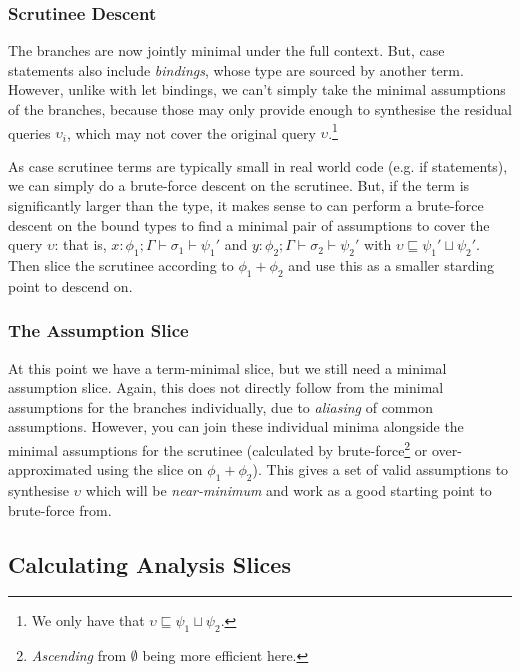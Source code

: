 \subsubsection{Scrutinee Descent}
\label{sec:case-phase2}

The branches are now jointly minimal under the full context. But, case statements also include \textit{bindings}, whose type are sourced by another term. However, unlike with let bindings, we can't simply take the minimal assumptions of the branches, because those may only provide enough to synthesise the residual queries $\upsilon_i$, which may not cover the original query $\upsilon$.\footnote{We only have that $\upsilon \sqsubseteq \psi_1 \sqcup \psi_2$.}

As case scrutinee terms are typically small in real world code (e.g. if statements), we can simply do a brute-force descent on the scrutinee. But, if the term is significantly larger than the type, it makes sense to can perform a brute-force descent on the bound types to find a minimal pair of assumptions to cover the query $\upsilon$: that is, $x : \phi_1; \Gamma \vdash \sigma_1 \vdash \psi_1'$ and $y : \phi_2; \Gamma \vdash \sigma_2 \vdash \psi_2'$ with $\upsilon \sqsubseteq \psi_1' \sqcup \psi_2'$. Then slice the scrutinee according to $\phi_1 + \phi_2$ and use this as a smaller starding point to descend on. 

\subsubsection{The Assumption Slice}
\label{sec:case-phase3}

At this point we have a term-minimal slice, but we still need a minimal assumption slice. Again, this does not directly follow from the minimal assumptions for the branches individually, due to \textit{aliasing} of common assumptions. However, you can join these individual minima alongside the minimal assumptions for the scrutinee (calculated by brute-force\footnote{\textit{Ascending} from $\emptyset$ being more efficient here.} or over-approximated using the slice on $\phi_1 + \phi_2$). This gives a set of valid assumptions to synthesise $\upsilon$ which will be \textit{near-minimum} and work as a good starting point to brute-force from.

\subsection{\po Calculating Analysis Slices}
\label{sec:ana-slice-calculus}

